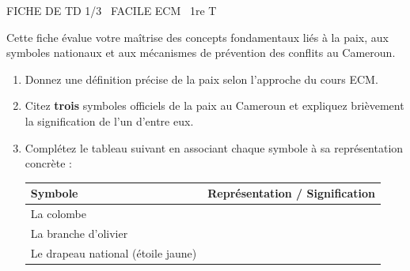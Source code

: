 \documentclass[11pt]{article}
\begin{document}
\begin{tcolorbox}[enhanced,colback=popink,colframe=popink,arc=10pt,boxrule=0pt,left=12pt,right=12pt,top=9pt,bottom=9pt]
{\color{white}\popxbold\small FICHE DE TD 1/3 \textbullet\ FACILE \hfill ECM \textbullet\ 1re T\par}
\end{tcolorbox}
\vspace{4pt}
Cette fiche évalue votre maîtrise des concepts fondamentaux liés à la paix, aux symboles nationaux et aux mécanismes de prévention des conflits au Cameroun.

\begin{exercice}
\begin{enumerate}
    \item Donnez une définition précise de la \og paix \fg{} selon l'approche du cours ECM.
    \item Citez \textbf{trois} symboles officiels de la paix au Cameroun et expliquez brièvement la signification de l'un d'entre eux.
    \item Complétez le tableau suivant en associant chaque symbole à sa représentation concrète :
    \begin{center}
    \begin{tabular}{|l|c|}
    \hline
    \textbf{Symbole} & \textbf{Représentation / Signification} \\
    \hline
    La colombe &  \\
    \hline
    La branche d'olivier &  \\
    \hline
    Le drapeau national (étoile jaune) &  \\
    \hline
    \end{tabular}
    \end{center}
\end{enumerate}
\end{exercice}
\end{document}

